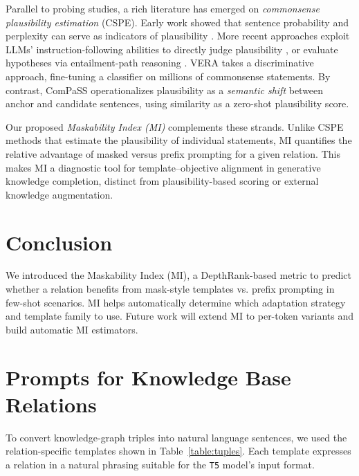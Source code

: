 \documentclass{i4c-en}
\begin{document}
	Parallel to probing studies, a rich literature has emerged on \emph{commonsense plausibility estimation} (CSPE). Early work showed that sentence probability and perplexity can serve as indicators of plausibility \cite{trinh2018simple,davison2019commonsense,liu2021commongen}. More recent approaches exploit LLMs’ instruction-following abilities to directly judge plausibility \cite{zhao2024llmcommonsense}, or evaluate hypotheses via entailment-path reasoning \cite{jung2022maieutic,tafjord2022entailer}. VERA \cite{liu2023vera} takes a discriminative approach, fine-tuning a classifier on millions of commonsense statements. By contrast, ComPaSS \cite{cui2025compass} operationalizes plausibility as a \emph{semantic shift} between anchor and candidate sentences, using similarity as a zero-shot plausibility score.
	
	Our proposed \emph{Maskability Index (MI)} complements these strands. Unlike CSPE methods that estimate the plausibility of individual statements, MI quantifies the relative advantage of masked versus prefix prompting for a given relation. This makes MI a diagnostic tool for template–objective alignment in generative knowledge completion, distinct from plausibility-based scoring or external knowledge augmentation.

	\section{Conclusion}
	We introduced the Maskability Index (MI), a DepthRank-based metric to predict whether a relation benefits from mask-style templates vs. prefix prompting in few-shot scenarios. MI helps automatically determine which adaptation strategy and template family to use. Future work will extend MI to per-token variants and build automatic MI estimators.
	

	





	
\appendix

\section{Prompts for Knowledge Base Relations}
To convert knowledge-graph triples into natural language sentences, we used the relation-specific templates shown in Table~\ref{table:tuples}. Each template expresses a relation in a natural phrasing suitable for the \texttt{T5} model’s input format.
\end{document}
